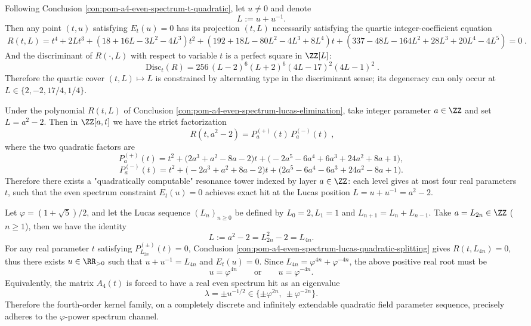 \begin{conclusion}\label{con:pom-a4-even-spectrum-lucas-elimination}
Following Conclusion \ref{con:pom-a4-even-spectrum-t-quadratic}, let \(u\neq 0\) and denote
\[
L:=u+u^{-1}.
\]
Then any point \((t,u)\) satisfying \(E_t(u)=0\) has its projection \((t,L)\) necessarily satisfying the quartic integer-coefficient equation
\[
\boxed{\;
R(t,L)=t^4+2Lt^3+(18+16L-3L^2-4L^3)t^2+(192+18L-80L^2-4L^3+8L^4)t
+(337-48L-164L^2+28L^3+20L^4-4L^5)=0\; } .
\]
And the discriminant of \(R(\cdot,L)\) with respect to variable \(t\) is a perfect square in \(\ZZ[L]\):
\[
\boxed{\;
\mathrm{Disc}_t(R)=256\,(L-2)^6(L+2)^6(4L-17)^2(4L-1)^2\; } .
\]
Therefore the quartic cover \((t,L)\mapsto L\) is constrained by alternating type in the discriminant sense; its degeneracy can only occur at
\(
L\in\{2,-2,17/4,1/4\}
\).
\end{conclusion}

\begin{conclusion}[Integer Parameter Subfamily \texorpdfstring{$L=a^2-2$}{L=a^2-2} Complete Quadratic Splitting]\label{con:pom-a4-even-spectrum-lucas-quadratic-splitting}
Under the polynomial \(R(t,L)\) of Conclusion \ref{con:pom-a4-even-spectrum-lucas-elimination}, take integer parameter \(a\in\ZZ\) and set \(L=a^2-2\).
Then in \(\ZZ[a,t]\) we have the strict factorization
\[
\boxed{\;
R(t,a^2-2)=P_a^{(+)}(t)\,P_a^{(-)}(t)\; } ,
\]
where the two quadratic factors are
\[
P_a^{(+)}(t)=t^2+\bigl(2a^3+a^2-8a-2\bigr)t+\bigl(-2a^5-6a^4+6a^3+24a^2+8a+1\bigr),
\]
\[
P_a^{(-)}(t)=t^2+\bigl(-2a^3+a^2+8a-2\bigr)t+\bigl(2a^5-6a^4-6a^3+24a^2-8a+1\bigr).
\]
Therefore there exists a "quadratically computable" resonance tower indexed by layer \(a\in\ZZ\): each level gives at most four real parameters \(t\), such that the even spectrum constraint \(E_t(u)=0\) achieves exact hit at the Lucas position \(L=u+u^{-1}=a^2-2\).
\end{conclusion}

\begin{conclusion}[Lucas Layer Golden Ratio Resonance Ladder: Real Even Spectrum Hits at \texorpdfstring{$u=\varphi^{\pm 4n}$}{u=phi^{pm4n}}]\label{con:pom-a4-even-spectrum-golden-resonance-ladder}
Let \(\varphi=(1+\sqrt5)/2\), and let the Lucas sequence \((L_n)_{n\ge 0}\) be defined by \(L_0=2,L_1=1\) and \(L_{n+1}=L_n+L_{n-1}\).
Take \(a=L_{2n}\in\ZZ\) (\(n\ge 1\)), then we have the identity
\[
L:=a^2-2=L_{2n}^2-2=L_{4n}.
\]
For any real parameter \(t\) satisfying \(P_{L_{2n}}^{(\pm)}(t)=0\), Conclusion \ref{con:pom-a4-even-spectrum-lucas-quadratic-splitting} gives \(R(t,L_{4n})=0\), thus there exists \(u\in\RR_{>0}\) such that \(u+u^{-1}=L_{4n}\) and \(E_t(u)=0\).
Since \(L_{4n}=\varphi^{4n}+\varphi^{-4n}\), the above positive real root must be
\[
u=\varphi^{4n}\qquad\text{or}\qquad u=\varphi^{-4n}.
\]
Equivalently, the matrix \(A_4(t)\) is forced to have a real even spectrum hit as an eigenvalue
\[
\lambda=\pm u^{-1/2}
\in\{\pm\varphi^{2n},\ \pm\varphi^{-2n}\}.
\]
Therefore the fourth-order kernel family, on a completely discrete and infinitely extendable quadratic field parameter sequence, precisely adheres to the \(\varphi\)-power spectrum channel.
\end{conclusion}

